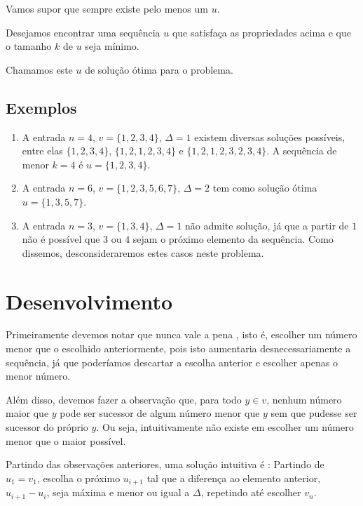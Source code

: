 Vamos supor que sempre existe pelo menos um $u$.

Desejamos encontrar uma sequência $u$ que satisfaça as propriedades acima e que o tamanho $k$ de $u$ seja mínimo.

Chamamos este $u$ de solução ótima para o problema.

\subsection*{Exemplos}

\begin{enumerate}
    \item A entrada $n = 4$, $v = \{1, 2, 3, 4\}$, $\Delta = 1$ existem diversas soluções possíveis, entre elas $\{1, 2, 3, 4\}$, $\{1, 2, 1, 2, 3, 4\}$ e $\{1, 2, 1, 2, 3, 2, 3, 4\}$. A sequência de menor $k = 4$ é $u = \{1, 2, 3, 4\}$.
    \item A entrada $n = 6$, $v = \{1, 2, 3, 5, 6, 7\}$, $\Delta = 2$ tem como solução ótima $u = \{1, 3, 5, 7\}$.
    \item A entrada $n = 3$, $v = \{1, 3, 4\}$, $\Delta = 1$ não admite solução, já que a partir de $1$ não é possível que $3$ ou $4$ sejam o próximo elemento da sequência. Como dissemos, desconsideraremos estes casos neste problema.
\end{enumerate}

\section{Desenvolvimento}

Primeiramente devemos notar que nunca vale a pena \textit{}, isto é, escolher um número menor que o escolhido anteriormente, pois isto aumentaria desnecessariamente a sequência, já que poderíamos descartar a escolha anterior e escolher apenas o menor número.

Além disso, devemos fazer a observação que, para todo $y \in v$, nenhum número maior que $y$ pode ser sucessor de algum número menor que $y$ sem que pudesse ser sucessor do próprio $y$. Ou seja, intuitivamente não existe \textit{} em escolher um número menor que o maior possível.

\label{salto:abor}

Partindo das observações anteriores, uma solução intuitiva é \textit{}: Partindo de $u_1 = v_1$, escolha o próximo $u_{i + 1}$ tal que a diferença ao elemento anterior, $u_{i + 1} - u_i$, seja máxima e menor ou igual a $\Delta$, repetindo até escolher $v_n$.

